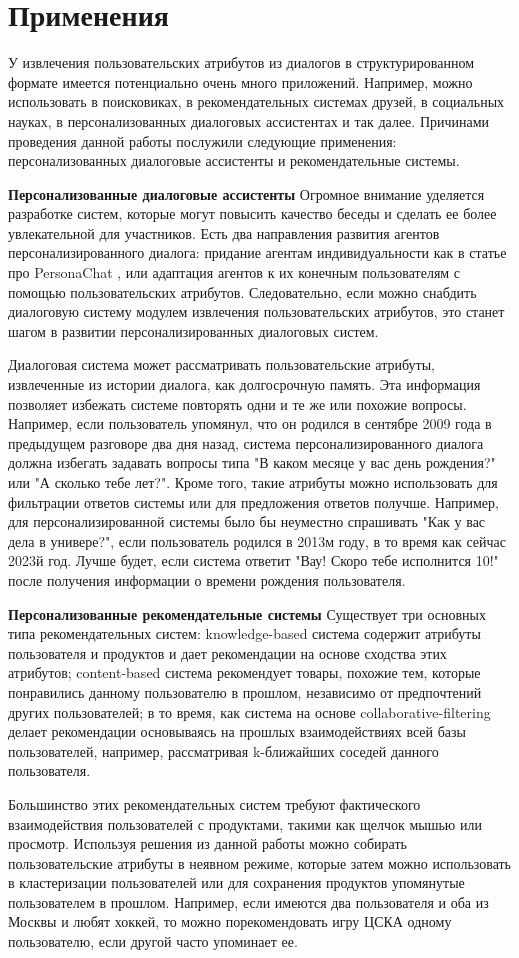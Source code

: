 \section{Применения}

У извлечения пользовательских атрибутов из диалогов в структурированном формате имеется потенциально очень много приложений. Например, можно использовать в поисковиках, в рекомендательных системах друзей, в социальных науках, в персонализованных диалоговых ассистентах и так далее. Причинами проведения данной работы послужили следующие применения: персонализованных диалоговые ассистенты и рекомендательные системы.

\textbf{Персонализованные диалоговые ассистенты}    Огромное внимание уделяется разработке систем, которые могут повысить качество беседы и сделать ее более увлекательной для участников. Есть два направления развития агентов персонализированного диалога: придание агентам индивидуальности как в статье про PersonaChat \cite{personachat}, или адаптация агентов к их конечным пользователям с помощью пользовательских атрибутов. Следовательно, если можно снабдить диалоговую систему модулем извлечения пользовательских атрибутов, это станет шагом в развитии персонализированных диалоговых систем.

Диалоговая система может рассматривать пользовательские атрибуты, извлеченные из истории диалога, как долгосрочную память. Эта информация позволяет избежать системе повторять одни и те же или похожие вопросы. Например, если пользователь упомянул, что он родился в сентябре 2009 года в предыдущем разговоре два дня назад, система персонализированного диалога должна избегать задавать вопросы типа "В каком месяце у вас день рождения?" или "А сколько тебе лет?". Кроме того, такие атрибуты можно использовать для фильтрации ответов системы или для предложения ответов получше. Например, для персонализированной системы было бы неуместно спрашивать "Как у вас дела в универе?", если пользователь родился в 2013м году, в то время как сейчас 2023й год. Лучше будет, если система ответит "Вау! Скоро тебе исполнится 10!" после получения информации о времени рождения пользователя.

\textbf{Персонализованные рекомендательные системы}     Существует три основных типа рекомендательных систем: knowledge-based система содержит атрибуты пользователя и продуктов и дает рекомендации на основе сходства этих атрибутов; content-based система рекомендует товары, похожие тем, которые понравились данному пользователю в прошлом, независимо от предпочтений других пользователей; в то время, как система на основе collaborative-filtering делает рекомендации основываясь на прошлых взаимодействиях всей базы пользователей, например, рассматривая k-ближайших соседей данного пользователя.

Большинство этих рекомендательных систем требуют фактического взаимодействия пользователей с продуктами, такими как щелчок мышью или просмотр. Используя решения из данной работы можно собирать пользовательские атрибуты в неявном режиме, которые затем можно использовать в кластеризации пользователей или для сохранения продуктов упомянутые пользователем в прошлом. Например, если имеются два пользователя и оба из Москвы и любят хоккей, то можно порекомендовать игру ЦСКА одному пользователю, если другой часто упоминает ее.
